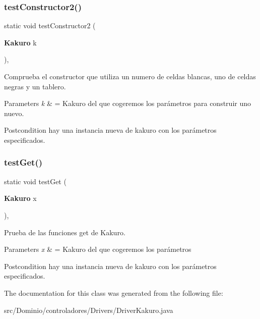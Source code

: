 \subsubsection{test\+Constructor2()}
{\footnotesize\ttfamily static void test\+Constructor2 (\begin{DoxyParamCaption}\item[{\textbf{ Kakuro}}]{k }\end{DoxyParamCaption})\hspace{0.3cm}{\ttfamily [inline]}, {\ttfamily [static]}}



Comprueba el constructor que utiliza un numero de celdas blancas, uno de celdas negras y un tablero. 


\begin{DoxyParams}{Parameters}
{\em k} & = Kakuro del que cogeremos los parámetros para construir uno nuevo. \\
\hline
\end{DoxyParams}
\begin{DoxyPostcond}{Postcondition}
hay una instancia nueva de kakuro con los parámetros especificados. 
\end{DoxyPostcond}
\mbox{\label{class_dominio_1_1controladores_1_1_drivers_1_1_driver_kakuro_a4417f9d6c4ea3db3e02b3935c67802a2}} 
\subsubsection{test\+Get()}
{\footnotesize\ttfamily static void test\+Get (\begin{DoxyParamCaption}\item[{\textbf{ Kakuro}}]{x }\end{DoxyParamCaption})\hspace{0.3cm}{\ttfamily [inline]}, {\ttfamily [static]}}



Prueba de las funciones get de Kakuro. 


\begin{DoxyParams}{Parameters}
{\em x} & = Kakuro del que cogeremos los parámetros \\
\hline
\end{DoxyParams}
\begin{DoxyPostcond}{Postcondition}
hay una instancia nueva de kakuro con los parámetros especificados. 
\end{DoxyPostcond}


The documentation for this class was generated from the following file\+:\begin{DoxyCompactItemize}
\item 
src/\+Dominio/controladores/\+Drivers/Driver\+Kakuro.\+java\end{DoxyCompactItemize}
